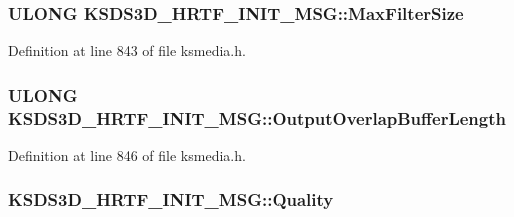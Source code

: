 \subsubsection[{\texorpdfstring{Max\+Filter\+Size}{MaxFilterSize}}]{\setlength{\rightskip}{0pt plus 5cm}U\+L\+O\+NG K\+S\+D\+S3\+D\+\_\+\+H\+R\+T\+F\+\_\+\+I\+N\+I\+T\+\_\+\+M\+S\+G\+::\+Max\+Filter\+Size}\hypertarget{struct_k_s_d_s3_d___h_r_t_f___i_n_i_t___m_s_g_a644714c2b02710ce60af4956d9bfaa01}{}\label{struct_k_s_d_s3_d___h_r_t_f___i_n_i_t___m_s_g_a644714c2b02710ce60af4956d9bfaa01}


Definition at line 843 of file ksmedia.\+h.

\subsubsection[{\texorpdfstring{Output\+Overlap\+Buffer\+Length}{OutputOverlapBufferLength}}]{\setlength{\rightskip}{0pt plus 5cm}U\+L\+O\+NG K\+S\+D\+S3\+D\+\_\+\+H\+R\+T\+F\+\_\+\+I\+N\+I\+T\+\_\+\+M\+S\+G\+::\+Output\+Overlap\+Buffer\+Length}\hypertarget{struct_k_s_d_s3_d___h_r_t_f___i_n_i_t___m_s_g_a8cf1866efee88e1eeece8c179d756676}{}\label{struct_k_s_d_s3_d___h_r_t_f___i_n_i_t___m_s_g_a8cf1866efee88e1eeece8c179d756676}


Definition at line 846 of file ksmedia.\+h.

\subsubsection[{\texorpdfstring{Quality}{Quality}}]{ K\+S\+D\+S3\+D\+\_\+\+H\+R\+T\+F\+\_\+\+I\+N\+I\+T\+\_\+\+M\+S\+G\+::\+Quality}\hypertarget{struct_k_s_d_s3_d___h_r_t_f___i_n_i_t___m_s_g_a84395acb281055eb3d0fa168051219e1}{}\label{struct_k_s_d_s3_d___h_r_t_f___i_n_i_t___m_s_g_a84395acb281055eb3d0fa168051219e1}


